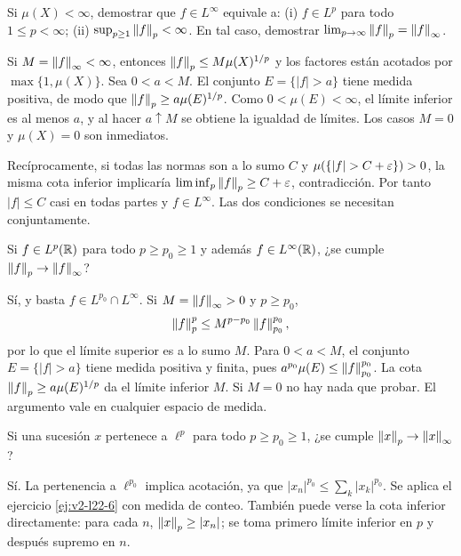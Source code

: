 \begin{ejercicio}\label{ej:v2-l22-5}
Si $\mu(X)<\infty$, demostrar que $f\in L^\infty$ equivale a: (i) $f\in L^p$ para todo $1\le p<\infty$; (ii) $\sup_{p\ge1}\left\lVert f\right\rVert_p<\infty$. En tal caso, demostrar $\lim_{p\to\infty}\left\lVert f\right\rVert_p=\left\lVert f\right\rVert_\infty$.
\end{ejercicio}
\begin{solucion}
Si $M=\left\lVert f\right\rVert_\infty<\infty$, entonces $\left\lVert f\right\rVert_p\le M\mu(X)^{1/p}$ y los factores están acotados por $\max\{1,\mu(X)\}$. Sea $0<a<M$. El conjunto $E=\{|f|>a\}$ tiene medida positiva, de modo que $\left\lVert f\right\rVert_p\ge a\mu(E)^{1/p}$. Como $0<\mu(E)<\infty$, el límite inferior es al menos $a$, y al hacer $a\uparrow M$ se obtiene la igualdad de límites. Los casos $M=0$ y $\mu(X)=0$ son inmediatos.

Recíprocamente, si todas las normas son a lo sumo $C$ y $\mu(\{|f|>C+\eps\})>0$, la misma cota inferior implicaría $\liminf_p\left\lVert f\right\rVert_p\ge C+\varepsilon$, contradicción. Por tanto $|f|\le C$ casi en todas partes y $f\in L^\infty$. Las dos condiciones se necesitan conjuntamente.
\end{solucion}

\begin{ejercicio}\label{ej:v2-l22-6}
Si $f\in L^p(\mathbb R)$ para todo $p\ge p_0\ge1$ y además $f\in L^\infty(\mathbb R)$, ¿se cumple $\left\lVert f\right\rVert_p\to\left\lVert f\right\rVert_\infty$?
\end{ejercicio}
\begin{solucion}
Sí, y basta $f\in L^{p_0}\cap L^\infty$. Si $M=\left\lVert f\right\rVert_\infty>0$ y $p\ge p_0$,
\[
 \left\lVert f\right\rVert_p^p\le M^{p-p_0}\left\lVert f\right\rVert_{p_0}^{p_0},
\]
por lo que el límite superior es a lo sumo $M$. Para $0<a<M$, el conjunto $E=\{|f|>a\}$ tiene medida positiva y finita, pues $a^{p_0}\mu(E)\le\left\lVert f\right\rVert_{p_0}^{p_0}$. La cota $\left\lVert f\right\rVert_p\ge a\mu(E)^{1/p}$ da el límite inferior $M$. Si $M=0$ no hay nada que probar. El argumento vale en cualquier espacio de medida.
\end{solucion}

\begin{ejercicio}\label{ej:v2-l22-7}
Si una sucesión $x$ pertenece a $\ell^p$ para todo $p\ge p_0\ge1$, ¿se cumple $\left\lVert x\right\rVert_p\to\left\lVert x\right\rVert_\infty$?
\end{ejercicio}
\begin{solucion}
Sí. La pertenencia a $\ell^{p_0}$ implica acotación, ya que $|x_n|^{p_0}\le\sum_k|x_k|^{p_0}$. Se aplica el ejercicio \ref{ej:v2-l22-6} con medida de conteo. También puede verse la cota inferior directamente: para cada $n$, $\left\lVert x\right\rVert_p\ge|x_n|$; se toma primero límite inferior en $p$ y después supremo en $n$.
\end{solucion}

